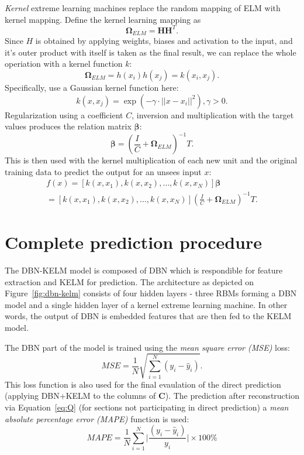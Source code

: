\textit{Kernel} extreme learning machines replace the random mapping of
ELM with kernel mapping. Define the kernel learning mapping as
\begin{equation}
	\mathbf{\Omega}_{ELM}=\mathbf{H}\mathbf{H}^T.
	\label{eq:Omega}
\end{equation}
Since $H$ is obtained by applying weights, biases and activation to the input,
and it's outer product with itself is taken as the final result, we can replace 
the whole operiation with a kernel function $k$:
\begin{equation}
	\mathbf{\Omega}_{ELM}=h(x_i)h(x_j)=k(x_i,x_j).
\end{equation}
Specifically, \citet{Han.2020} use a Gaussian kernel function here:
\begin{equation}
	k(x,x_j)=\exp(-\gamma\cdot||x-x_i||^2),\gamma>0.
	\label{eq:Gaussian_kernel}
\end{equation}
Regularization using a coefficient $C$, inversion and multiplication with the
target values produces the relation matrix $\mathbf{\beta}$:
\begin{equation}
	\mathbf{\beta}=(\frac{I}{C}+\mathbf{\Omega}_{ELM})^{-1}T.
	\label{eq:beta}
\end{equation}
This is then used with the kernel multiplication of each new unit and the
original training data to predict the output for an unsees input $x$:
\begin{equation}
	\begin{split}
		f(x)=[k(x,x_1),k(x,x_2),\ldots,k(x,x_N)]\mathbf{\beta} \\
		=[k(x,x_1),k(x,x_2),\ldots,k(x,x_N)]
		(\frac{I}{C}+\mathbf{\Omega}_{ELM})^{-1}T.
	\end{split}
	\label{eq:kelm-inference}
\end{equation}


\section{Complete prediction procedure}

The DBN-KELM model is composed of DBN which is respondible for feature
extraction and KELM for prediction. The architecture as depicted on
Figure~\ref{fig:dbn-kelm} consists of four hidden layers - three RBMs forming a
DBN model and a single hidden layer of a kernel extreme learning machine. In
other words, the output of DBN is embedded features that are then fed to the
KELM model.

The DBN part of the model is trained using the \textit{mean square error (MSE)} 
loss:
\begin{equation}
	MSE=\frac{1}{N}\sqrt{\sum_{i=1}^N(y_i-\hat{y}_i)}.
	\label{eq:mse}
\end{equation}
This loss function is also used for the final evaulation of the direct
prediction (applying DBN+KELM to the columns of $\mathbf{C}$). The prediction
after reconstruction via Equation~\ref{eq:Q} (for sections not participating in
direct prediction) a \textit{mean absolute percentage error (MAPE)} function is
used:
\begin{equation}
	MAPE=\frac{1}{N}\sum_{i=1}^N\bigg |\frac{(y_i-\hat{y}_i)}{y_i}\bigg |
	\times 100\%
	\label{eq:mape}
\end{equation}

